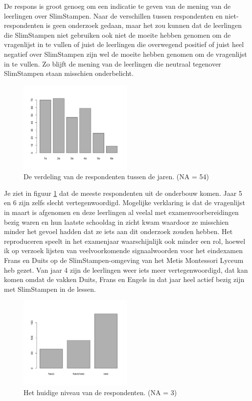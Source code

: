\documentclass[12pt, a4paper]{article}
\begin{document}
De respons is groot genoeg om een indicatie te geven van de mening van de leerlingen over SlimStampen. Naar de verschillen tussen respondenten en niet-respondenten is geen onderzoek gedaan, maar het zou kunnen dat de leerlingen die SlimStampen niet gebruiken ook niet de moeite hebben genomen om de vragenlijst in te vullen of juist de leerlingen die overwegend positief of juist heel negatief over SlimStampen zijn wel de moeite hebben genomen om de vragenlijst in te vullen. Zo blijft de mening van de leerlingen die neutraal tegenover SlimStampen staan misschien onderbelicht.

\begin{figure}[h]
    \centering
    \includegraphics[width=0.5\textwidth]{Verdeling klassen.png}
    \caption{De verdeling van de respondenten tussen de jaren. (NA = 54)}
    \label{fig:verdeling}
    \end{figure}

Je ziet in figuur \ref*{fig:verdeling} dat de meeste respondenten uit de onderbouw komen. Jaar 5 en 6 zijn zelfs slecht vertegenwoordigd. Mogelijke verklaring is dat de vragenlijst in maart is afgenomen en deze leerlingen al veelal met examenvoorbereidingen bezig waren en hun laatste schooldag in zicht kwam waardoor ze misschien minder het gevoel hadden dat ze iets aan dit onderzoek zouden hebben. Het reproduceren speelt in het examenjaar waarschijnlijk ook minder een rol, hoewel ik op verzoek lijsten van veelvoorkomende signaalwoorden voor het eindexamen Frans en Duits op de SlimStampen-omgeving van het Metis Montessori Lyceum heb gezet. Van jaar 4 zijn de leerlingen weer iets meer vertegenwoordigd, dat kan komen omdat de vakken Duits, Frans en Engels in dat jaar heel actief bezig zijn met SlimStampen in de lessen. 

\begin{figure}[h]
        \centering
        \includegraphics[width=0.5\textwidth]{niveau.png}
        \caption{Het huidige niveau van de respondenten. (NA = 3)}
        \label{fig:niveau}
        \end{figure}
\end{document}
